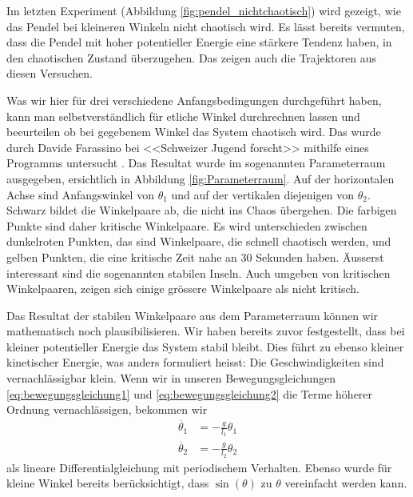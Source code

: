 Im letzten Experiment (Abbildung \ref{fig:pendel_nichtchaotisch}) wird gezeigt,
wie das Pendel bei kleineren Winkeln nicht chaotisch wird.
Es lässt bereits vermuten, dass die Pendel mit hoher potentieller Energie eine stärkere Tendenz haben,
in den chaotischen Zustand überzugehen.
Das zeigen auch die Trajektoren aus diesen Versuchen.

Was wir hier für drei verschiedene Anfangsbedingungen durchgeführt haben, kann man selbstverständlich
für etliche Winkel durchrechnen lassen und beeurteilen ob bei gegebenem Winkel das System chaotisch wird.
%
Das wurde durch Davide Farassino bei <<Schweizer Jugend forscht>> 
mithilfe eines Programms untersucht \cite{doppelpendel:wettbewerbsarbeit}.
Das Resultat wurde im sogenannten Parameterraum ausgegeben,
ersichtlich in Abbildung \ref{fig:Parameterraum}.
Auf der horizontalen Achse sind Anfangswinkel von \(\theta_1\) und
auf der vertikalen diejenigen von \(\theta_2\).
Schwarz bildet die Winkelpaare ab, die nicht ins Chaos übergehen.
Die farbigen Punkte sind daher kritische Winkelpaare.
Es wird unterschieden zwischen dunkelroten Punkten,
das sind Winkelpaare, die schnell chaotisch werden, und
gelben Punkten, die eine kritische Zeit nahe an 30 Sekunden haben.
Äusserst interessant sind die sogenannten stabilen Inseln.
Auch umgeben von kritischen Winkelpaaren, zeigen sich einige
grössere Winkelpaare als nicht kritisch.

Das Resultat der stabilen Winkelpaare aus dem Parameterraum können wir mathematisch noch plausibilisieren.
Wir haben bereits zuvor festgestellt, dass bei kleiner potentieller Energie das System stabil bleibt.
Dies führt zu ebenso kleiner kinetischer Energie, was anders formuliert heisst:
Die Geschwindigkeiten sind vernachlässigbar klein.
Wenn wir in unseren Bewegungsgleichungen
\eqref{eq:bewegungsgleichung1} und \eqref{eq:bewegungsgleichung2}
die Terme höherer Ordnung vernachlässigen, bekommen wir
\begin{align*}
\ddot{\theta_1} &= -\frac{g}{l_1} \theta_1\\
\ddot{\theta_2} &= -\frac{g}{l_2} \theta_2
\end{align*}
als lineare Differentialgleichung mit periodischem Verhalten.
Ebenso wurde für kleine Winkel bereits berücksichtigt,
dass \(\sin(\theta)\) zu \(\theta\) vereinfacht werden kann.

